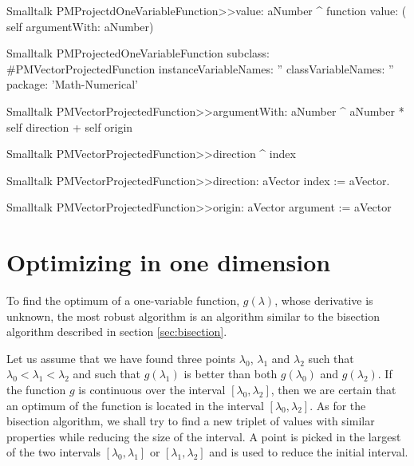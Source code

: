 \begin{displaycode}{Smalltalk}
PMProjectdOneVariableFunction>>value: aNumber
    ^ function value: ( self argumentWith: aNumber)
\end{displaycode}


\begin{displaycode}{Smalltalk}
PMProjectedOneVariableFunction subclass: #PMVectorProjectedFunction
   instanceVariableNames: ''
   classVariableNames: ''
   package: 'Math-Numerical'
\end{displaycode}

\begin{displaycode}{Smalltalk}
PMVectorProjectedFunction>>argumentWith: aNumber
    ^ aNumber * self direction + self origin
\end{displaycode}

\begin{displaycode}{Smalltalk}
PMVectorProjectedFunction>>direction
    ^ index
\end{displaycode}

\begin{displaycode}{Smalltalk}
PMVectorProjectedFunction>>direction: aVector
    index := aVector.
\end{displaycode}

\begin{displaycode}{Smalltalk}
PMVectorProjectedFunction>>origin}
    ^ argument
\end{displaycode}

\begin{displaycode}{Smalltalk}
PMVectorProjectedFunction>>origin: aVector
    argument := aVector
\end{displaycode}

\section{Optimizing in one dimension}
\label{sec:optonedim} To find the optimum of a one-variable
function, $g\left(\lambda\right)$, whose derivative is unknown,
the most robust algorithm is an algorithm similar to the bisection
algorithm described in section \ref{sec:bisection}.

Let us assume that we have found three points $\lambda_0$,
$\lambda_1$ and $\lambda_2$ such that
$\lambda_0<\lambda_1<\lambda_2$ and such that
$g\left(\lambda_1\right)$ is better than both
$g\left(\lambda_0\right)$ and $g\left(\lambda_2\right)$. If the
function $g$ is continuous over the interval
$$, then we are certain that an
optimum of the function is located in the interval
$$. As for the bisection
algorithm, we shall try to find a new triplet of values with
similar properties while reducing the size of the interval. A
point is picked in the largest of the two intervals
$$ or
$$ and is used to reduce the
initial interval.

